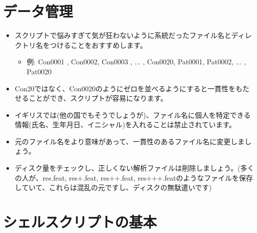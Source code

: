 \documentclass{jsarticle}
\begin{document}
\section{データ管理}


\begin{itemize}
\item スクリプトで悩みすぎて気が狂わないように系統だったファイル名とディレクトリ名をつけることをおすすめします。
	\begin{itemize}
	\item 例: {\color{red}Con0001 , Con0002, Con0003 , ... , Con0020, Pat0001, Pat0002, ... , Pat0020}
	\end{itemize}
\item {\color{red}Con20}ではなく、{\color{red}Con0020}のようにゼロを並べるようにすると一貫性をもたせることができ、スクリプトが容易になります。
\item イギリスでは(他の国でもそうでしょうが)、ファイル名に個人を特定できる情報(氏名、生年月日、イニシャル)を入れることは禁止されています。
\item 元のファイル名をより意味があって、一貫性のあるファイル名に変更しましょう。
\item ディスク量をチェックし、正しくない解析ファイルは削除しましょう。(多くの人が、{\color{red}res.feat, res+.feat, res++.feat, res+++.feat}のようなファイルを保存していて、これらは混乱の元ですし、ディスクの無駄遣いです) 
\end{itemize}


\section{シェルスクリプトの基本}
\end{document}
